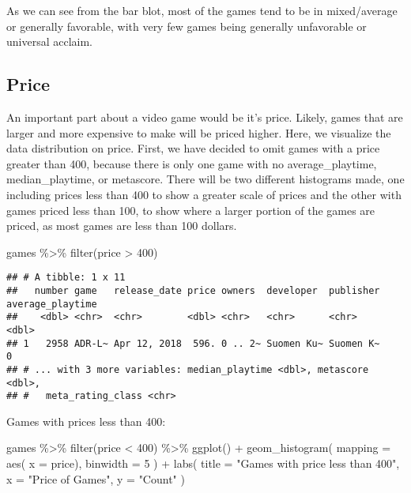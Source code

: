 \documentclass[
]{article}
\newenvironment{Shaded}{\begin{snugshade}}{\end{snugshade}}
\newcommand{\AttributeTok}[1]{\textcolor[rgb]{0.77,0.63,0.00}{#1}}
\newcommand{\DecValTok}[1]{\textcolor[rgb]{0.00,0.00,0.81}{#1}}
\newcommand{\FunctionTok}[1]{\textcolor[rgb]{0.00,0.00,0.00}{#1}}
\newcommand{\NormalTok}[1]{#1}
\newcommand{\SpecialCharTok}[1]{\textcolor[rgb]{0.00,0.00,0.00}{#1}}
\newcommand{\StringTok}[1]{\textcolor[rgb]{0.31,0.60,0.02}{#1}}
\begin{document}
As we can see from the bar blot, most of the games tend to be in
mixed/average or generally favorable, with very few games being
generally unfavorable or universal acclaim.

\hypertarget{price}{%
\subsection{Price}\label{price}}

An important part about a video game would be it's price. Likely, games
that are larger and more expensive to make will be priced higher. Here,
we visualize the data distribution on price. First, we have decided to
omit games with a price greater than 400, because there is only one game
with no average\_playtime, median\_playtime, or metascore. There will be
two different histograms made, one including prices less than 400 to
show a greater scale of prices and the other with games priced less than
100, to show where a larger portion of the games are priced, as most
games are less than 100 dollars.

\begin{Shaded}
\begin{Highlighting}[]
\NormalTok{games }\SpecialCharTok{\%\textgreater{}\%}
  \FunctionTok{filter}\NormalTok{(price }\SpecialCharTok{\textgreater{}} \DecValTok{400}\NormalTok{)}
\end{Highlighting}
\end{Shaded}

\begin{verbatim}
## # A tibble: 1 x 11
##   number game   release_date price owners  developer  publisher average_playtime
##    <dbl> <chr>  <chr>        <dbl> <chr>   <chr>      <chr>                <dbl>
## 1   2958 ADR-L~ Apr 12, 2018  596. 0 .. 2~ Suomen Ku~ Suomen K~                0
## # ... with 3 more variables: median_playtime <dbl>, metascore <dbl>,
## #   meta_rating_class <chr>
\end{verbatim}

Games with prices less than 400:

\begin{Shaded}
\begin{Highlighting}[]
\NormalTok{games }\SpecialCharTok{\%\textgreater{}\%}
  \FunctionTok{filter}\NormalTok{(price }\SpecialCharTok{\textless{}} \DecValTok{400}\NormalTok{) }\SpecialCharTok{\%\textgreater{}\%}
  \FunctionTok{ggplot}\NormalTok{() }\SpecialCharTok{+}
  \FunctionTok{geom\_histogram}\NormalTok{(}
    \AttributeTok{mapping =} \FunctionTok{aes}\NormalTok{(}
      \AttributeTok{x =}\NormalTok{ price),}
    \AttributeTok{binwidth =}  \DecValTok{5}
\NormalTok{  ) }\SpecialCharTok{+}
  \FunctionTok{labs}\NormalTok{(}
    \AttributeTok{title =} \StringTok{"Games with price less than 400"}\NormalTok{,}
    \AttributeTok{x =} \StringTok{"Price of Games"}\NormalTok{,}
    \AttributeTok{y =} \StringTok{"Count"}
\NormalTok{  )}
\end{Highlighting}
\end{Shaded}
\end{document}
